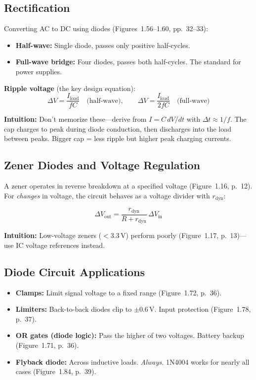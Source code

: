 \documentclass[11pt,a4paper]{article}
\newcommand{\intuition}[1]{\par\textcolor{intuition}{\textbf{Intuition:}} #1}
\begin{document}
\subsection{Rectification}

Converting AC to DC using diodes (Figures~1.56--1.60, pp.~32--33):

\begin{itemize}[nosep]
\item \textbf{Half-wave:} Single diode, passes only positive half-cycles.
\item \textbf{Full-wave bridge:} Four diodes, passes both half-cycles. The standard for power supplies.
\end{itemize}

\textbf{Ripple voltage} (the key design equation):
\begin{equation}
\Delta V = \frac{I_{\text{load}}}{fC} \quad \text{(half-wave)}, \qquad
\Delta V = \frac{I_{\text{load}}}{2fC} \quad \text{(full-wave)}
\end{equation}

\intuition{Don't memorize these---derive from $I = C\,dV/dt$ with $\Delta t \approx 1/f$. The cap charges to peak during diode conduction, then discharges into the load between peaks. Bigger cap = less ripple but higher peak charging currents.}

\subsection{Zener Diodes and Voltage Regulation}

A zener operates in reverse breakdown at a specified voltage (Figure~1.16, p.~12). For \emph{changes} in voltage, the circuit behaves as a voltage divider with $r_{\text{dyn}}$:

\begin{equation}
\Delta V_{\text{out}} = \frac{r_{\text{dyn}}}{R + r_{\text{dyn}}} \, \Delta V_{\text{in}}
\end{equation}

\intuition{Low-voltage zeners ($<3.3\,$V) perform poorly (Figure~1.17, p.~13)---use IC voltage references instead.}

\subsection{Diode Circuit Applications}

\begin{itemize}[nosep]
\item \textbf{Clamps:} Limit signal voltage to a fixed range (Figure~1.72, p.~36).
\item \textbf{Limiters:} Back-to-back diodes clip to $\pm 0.6\,$V. Input protection (Figure~1.78, p.~37).
\item \textbf{OR gates (diode logic):} Pass the higher of two voltages. Battery backup (Figure~1.71, p.~36).
\item \textbf{Flyback diode:} Across inductive loads. \emph{Always.} 1N4004 works for nearly all cases (Figure~1.84, p.~39).
\end{itemize}
\end{document}
